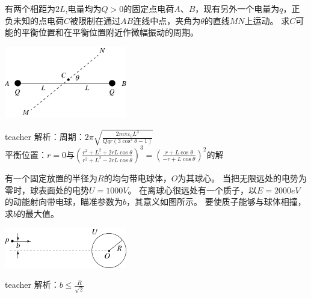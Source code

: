 \begin{example}
有两个相距为$2L$,电量均为$Q>0$的固定点电荷$A$、$B$，现有另外一个电量为$q$，正负未知的点电荷$C$被限制在通过$AB$连线中点，夹角为$\theta$的直线$MN$上运动。
求$C$可能的平衡位置和在平衡位置附近作微幅振动的周期。
\begin{flushright}
\includegraphics[width=0.4\textwidth]{images/elec-problem-7.pdf}
\end{flushright}
\begin{taggedblock}{teacher}
\noindent
解析：周期：$2\pi\sqrt{\frac{2m\pi\varepsilon_0L^3}{Qqr(3\cos^2\theta-1)}}$
\\平衡位置：$r=0$与$(\frac{r^2+L^2+2rL\cos\theta}{r^2+L^2-2rL\cos\theta})^3=(\frac{r+L\cos\theta}{-r+L\cos\theta})^2$的解
\end{taggedblock}
\end{example}

\begin{example}
有一个固定放置的半径为$R$的均匀带电球体，$O$为其球心。
当把无限远处的电势为零时，球表面处的电势$U=1000\unit{V}$。
在离球心很远处有一个质子，以$E = 2000\unit{eV}$的动能射向带电球，瞄准参数为$b$，其意义如图所示。
要使质子能够与球体相撞，求$b$的最大值。
\begin{flushright}
\includegraphics[width=0.4\textwidth]{images/elec-problem-8.pdf}
\end{flushright}
\begin{taggedblock}{teacher}
\noindent
解析：$b\leq\frac{R}{\sqrt{2}}$ 
\end{taggedblock}
\end{example}


